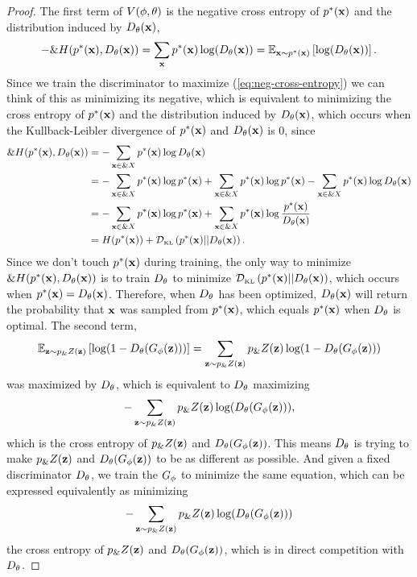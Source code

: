 \begin{proof}
  The first term of $V(\phi, \theta)$ is the negative cross entropy of $p^*(\mathbf{x})$ and
  the distribution induced by $D_\theta(\mathbf{x})$,
\begin{align}
  \label{eq:neg-cross-entropy}
  - \&H(\pt, \D(\*x)) = \sum_{\*x}\pt\log(\D(\*x)) = \mathbb{E}_{\*x \sim \pt} \left[\log(\D(\*x))\right].
\end{align}
Since we train the discriminator to maximize
(\ref{eq:neg-cross-entropy}) we can think of this as minimizing its
negative, which is equivalent to minimizing the cross entropy of $p^*(\mathbf{x})$
and the distribution induced by $D_\theta(\mathbf{x})$, which occurs when the
Kullback-Leibler divergence of $p^*(\mathbf{x})$ and $D_\theta(\mathbf{x})$ is 0, since
\begin{align}
  \&H(p^*(\mathbf{x}),D_\theta(\mathbf{x})) & = - \sum_{\mathbf{x} \in \&X} p^*(\mathbf{x}) \log D_\theta(\mathbf{x}) \\
                   & = -\sum_{\mathbf{x} \in \&X} p^*(\mathbf{x}) \log p^*(\mathbf{x}) + \sum_{\mathbf{x} \in \&X} p^*(\mathbf{x}) \log p^*(\mathbf{x}) - \sum_{\mathbf{x} \in \&X} p^*(\mathbf{x}) \log D_\theta(\mathbf{x}) \\
                   & = -\sum_{\mathbf{x} \in \&X} p^*(\mathbf{x}) \log p^*(\mathbf{x}) + \sum_{\mathbf{x} \in \&X} p^*(\mathbf{x}) \log {p^*(\mathbf{x})\over
                     D_\theta(\mathbf{x})}  \\
                   & = H(p^*(\mathbf{x})) + \mathcal{D}_{\text{\tiny KL}}\left( p^*(\mathbf{x}) \middle| \middle| D_\theta(\mathbf{x}) \right).
\end{align}
Since we don't touch $p^*(\mathbf{x})$ during training, the only way to minimize
$\&H(p^*(\mathbf{x}),D_\theta(\mathbf{x}))$ is to train $D_\theta$ to minimize $\mathcal{D}_{\text{\tiny KL}}\left( p^*(\mathbf{x}) \middle| \middle| D_\theta(\mathbf{x}) \right)$,
which occurs when $p^*(\mathbf{x}) = D_\theta(\mathbf{x})$. Therefore, when $D_\theta$ has been
optimized, $D_\theta(\mathbf{x})$ will return the probability that $\mathbf{x}$ was
sampled from $p^*(\mathbf{x})$, which equals $p^*(\mathbf{x})$ when $D_\theta$ is optimal. The
second term,
\begin{align}
  \mathbb{E}_{\mathbf{z} \sim p_\&Z(\mathbf{z})}\left[\log(1 - D_\theta(G_\phi(\mathbf{z})))\right] =
  \sum_{\mathbf{z} \sim p_\&Z(\mathbf{z})} p_\&Z(\mathbf{z}) \log (1 - D_\theta(G_\phi(\mathbf{z})))
\end{align}
was maximized by $D_\theta$, which is equivalent to $D_\theta$ maximizing
\begin{align}
  -\sum_{\mathbf{z} \sim p_\&Z(\mathbf{z})} p_\&Z(\mathbf{z}) \log (D_\theta(G_\phi(\mathbf{z}))),
\end{align}
which is the cross entropy of $p_\&Z(\mathbf{z})$ and $D_\theta(G_\phi(\mathbf{z}))$. This means $D_\theta$ is trying
to make $p_\&Z(\mathbf{z})$ and $D_\theta(G_\phi(\mathbf{z}))$ to be as different as possible. And given a
fixed discriminator $D_\theta$, we train the $G_\phi$ to minimize the same equation, which
can be expressed equivalently as minimizing
\begin{align}
  -\sum_{\mathbf{z} \sim p_\&Z(\mathbf{z})} p_\&Z(\mathbf{z}) \log (D_\theta(G_\phi(\mathbf{z})))
\end{align}
the cross entropy of $p_\&Z(\mathbf{z})$ and $D_\theta(G_\phi(\mathbf{z}))$, which is in direct competition
with $D_\theta$.
\end{proof}


